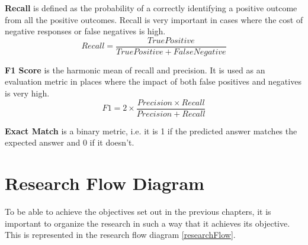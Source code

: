 \documentclass[a4paper,12pt]{report}
\begin{document}
	\textbf{Recall} is defined as the probability of a correctly identifying a positive outcome from all the positive outcomes. Recall is very important in cases where the cost of negative responses or false negatives is high.
		\begin{equation}\label{recall}
		Recall = \dfrac{True Positive}{True Positive +  False Negative }
	\end{equation}

	\textbf{F1 Score } is the harmonic mean of recall and precision. It is used as an evaluation metric in places where the impact of both false positives and negatives is very high. 
		\begin{equation}\label{f1}
		F1 = 2 \times \dfrac{Precision \times Recall}{Precision + Recall}
	\end{equation}

	\textbf{Exact Match} is a binary metric, i.e. it is 1 if the predicted answer matches the expected answer and 0 if it doesn't.
	
	\section{Research Flow Diagram}\label{c34}
	 To be able to achieve the objectives set out in the previous chapters, it is important to organize the research in such a way that it achieves its objective. This is represented in the research flow diagram \ref{researchFlow}. 
	
\end{document}
